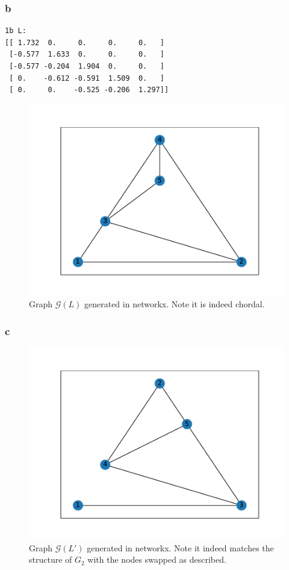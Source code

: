 \documentclass[11pt]{report}
\theoremstyle{definition}
\begin{document}
\subsubsection*{b}
\begin{lstlisting}[basicstyle=\small]
1b L:
[[ 1.732  0.     0.     0.     0.   ]
 [-0.577  1.633  0.     0.     0.   ]
 [-0.577 -0.204  1.904  0.     0.   ]
 [ 0.    -0.612 -0.591  1.509  0.   ]
 [ 0.     0.    -0.525 -0.206  1.297]]
\end{lstlisting}
\begin{figure}[H]
	\center
	\includegraphics[width=.8\textwidth]{one_b.pdf}
	\caption{Graph $\mathcal{G}(L)$ generated in networkx. Note it is indeed chordal.}
\end{figure}

\subsubsection*{c}
\begin{figure}[H]
	\center
	\includegraphics[width=.8\textwidth]{one_c.pdf}
	\caption{Graph $\mathcal{G}(L')$ generated in networkx. Note it indeed
		matches the structure of $G_2$ with the nodes swapped as described.}
\end{figure}
\end{document}
